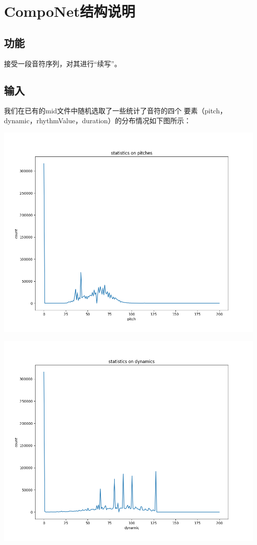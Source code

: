 \documentclass{article}
\begin{document}
\fi

  \section{CompoNet结构说明}
  \subsection{功能}
    接受一段音符序列，对其进行“续写”。
  \subsection{输入}
    我们在已有的mid文件中随机选取了一些统计了音符的四个
    要素（pitch，dynamic，rhythmValue，duration）的分布情况如下图所示：
    
    \includegraphics[width=.9\textwidth]{picture/pitches.png}
      
    \includegraphics[width=.9\textwidth]{picture/dynamics.png}
\end{document}
